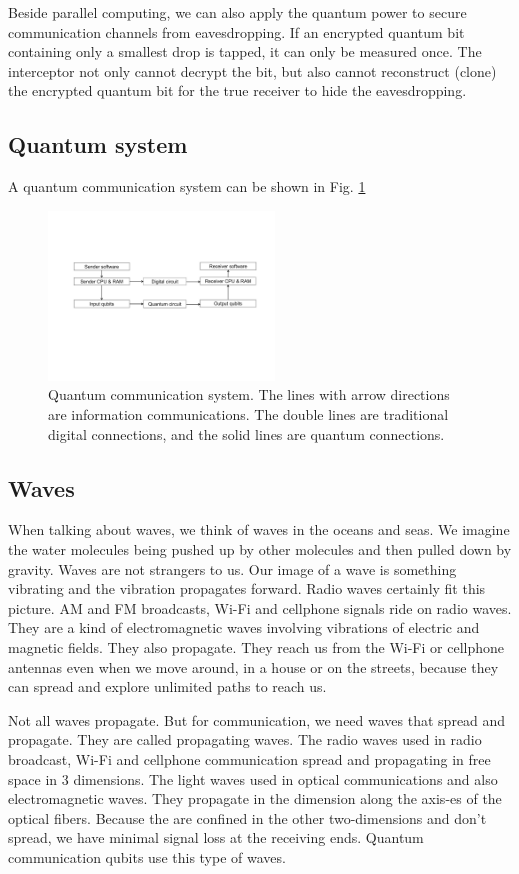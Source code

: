 \documentclass{book}
\begin{document}
Beside parallel computing, we can also apply the quantum power to secure communication channels from eavesdropping. If an encrypted quantum bit containing only a smallest drop is tapped, it can only be measured once. The interceptor not only cannot decrypt the bit, but also cannot reconstruct (clone) the encrypted quantum bit for the true receiver to hide the eavesdropping.

\subsection{Quantum system}
A quantum communication system can be shown in Fig. \ref{qsystem}

\begin{figure}[ht]
\includegraphics[width=6cm]{pic/q-circuit.pdf}
\caption{Quantum communication system. The lines with arrow directions are information communications. The double lines are traditional digital connections, and the solid lines are quantum connections. }
\label{qsystem}
\end{figure}

\subsection{Waves}
When talking about waves, we think of waves in the oceans and seas. We imagine the water molecules being pushed up by other molecules and then pulled down by gravity. Waves are not strangers to us. Our image of a wave is something vibrating and the vibration propagates forward. Radio waves certainly fit this picture. AM and FM broadcasts, Wi-Fi and cellphone signals ride on radio waves. They are a kind of electromagnetic waves involving vibrations of electric and magnetic fields. They also propagate. They reach us from the Wi-Fi or cellphone antennas even when we move around, in a house or on the streets, because they can spread and explore unlimited paths to reach us.

Not all waves propagate. But for communication, we need waves that spread and propagate. They are called propagating waves. The radio waves used in radio broadcast, Wi-Fi and cellphone communication spread and propagating in free space in 3 dimensions. The light waves used in optical communications and also electromagnetic waves. They propagate in the dimension along the axis-es of the optical fibers. Because the are confined in the other two-dimensions and don't spread, we have minimal signal loss at the receiving ends. Quantum communication qubits use this type of waves.
\end{document}
